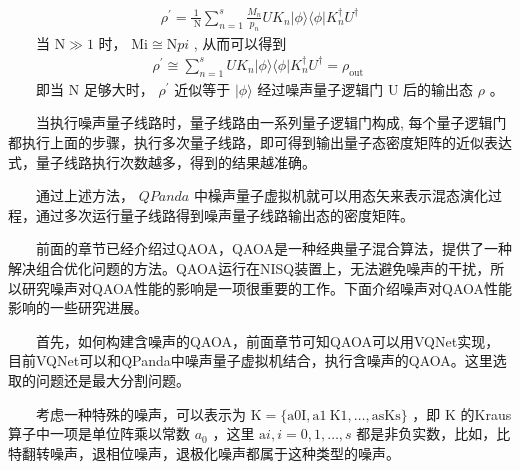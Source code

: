 \documentclass[a4paper,11pt,english]{sphinxmanual}
\begin{document}
\begin{equation*}
\begin{split}\rho^{\prime}=\frac{1}{\mathrm{~N}} \sum_{n=1}^{s} \frac{M_{n}}{p_{n}} U K_{n}|\phi\rangle\langle\phi| K_{n}^{\dagger} U^{\dagger}\end{split}
\end{equation*}
\sphinxAtStartPar
  当  \(\mathrm{N} \gg 1\) 时，  \(\mathrm{M}{\mathrm{i}} \cong \mathrm{N} p{i}\) , 从而可以得到
\begin{equation*}
\begin{split}\rho^{\prime} \cong \sum_{n=1}^{s} U K_{n}|\phi\rangle\langle\phi| K_{n}^{\dagger} U^{\dagger}=\rho_{\text {out }}\end{split}
\end{equation*}
\sphinxAtStartPar
  即当 \(\mathrm{N}\) 足够大时，  \(\rho^{\prime}\) 近似等于  \(|\phi\rangle\) 经过噪声量子逻辑门 \(\mathrm{U}\) 后的输出态 \(\rho\) 。

\sphinxAtStartPar
  当执行噪声量子线路时，量子线路由一系列量子逻辑门构成, 每个量子逻辑门都执行上面的步骤，执行多次量子线路，即可得到输出量子态密度矩阵的近似表达式，量子线路执行次数越多，得到的结果越准确。

\sphinxAtStartPar
  通过上述方法， \(QPanda\) 中橾声量子虚拟机就可以用态矢来表示混态演化过程，通过多次运行量子线路得到噪声量子线路输出态的密度矩阵。

\sphinxAtStartPar
{}

\sphinxAtStartPar
  前面的章节已经介绍过QAOA，QAOA是一种经典\sphinxhyphen{}量子混合算法，提供了一种解决组合优化问题的方法。QAOA运行在NISQ装置上，无法避免噪声的干扰，所以研究噪声对QAOA性能的影响是一项很重要的工作。下面介绍噪声对QAOA性能影响的一些研究进展。

\sphinxAtStartPar
  首先，如何构建含噪声的QAOA，前面章节可知QAOA可以用VQNet实现，目前VQNet可以和QPanda中噪声量子虚拟机结合，执行含噪声的QAOA。这里选取的问题还是最大分割问题。

\sphinxAtStartPar
{}

\sphinxAtStartPar
  考虑一种特殊的噪声，可以表示为 \(\mathrm{K}=\{\mathrm{a}{0} \mathrm{I}, \mathrm{a}{1} \mathrm{~K}{1}, \ldots, \mathrm{a}{\mathrm{s}} \mathrm{K}{\mathrm{s}}\}\) ，即  \(\mathrm{K}\) 的Kraus算子中一项是单位阵乘以常数 \(a_0\) ，这里 \(\mathrm{a}{i}, i=0,1, \ldots, s\) 都是非负实数，比如，比特翻转噪声，退相位噪声，退极化噪声都属于这种类型的噪声。

\sphinxAtStartPar
{}
\end{document}
